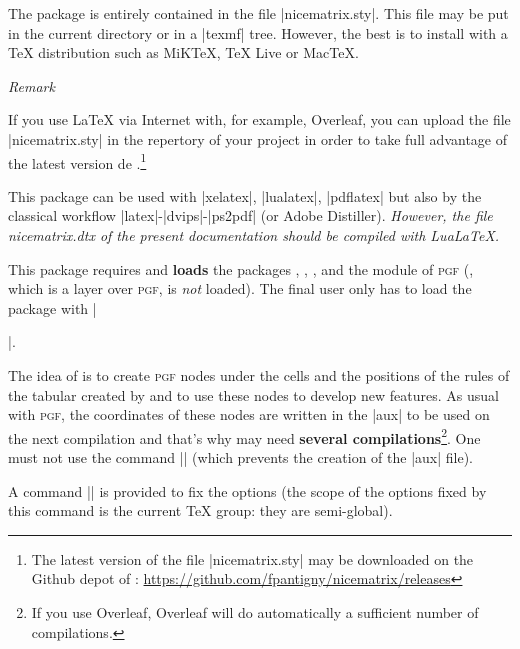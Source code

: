 \documentclass[dvipsnames]{article}%
\begin{document}
\vspace{1cm}
The package  is entirely contained in the file
|nicematrix.sty|. This file may be put in the current directory or in a
|texmf| tree. However, the best is to install  with a TeX
distribution such as MiKTeX, TeX Live or MacTeX.

\medskip
\emph{Remark}\par\nobreak

If you use LaTeX via Internet with, for example, Overleaf, you
can upload the file |nicematrix.sty| in the repertory of your 
project in order to take full advantage of the latest version de
.\footnote{The latest version of the file
|nicematrix.sty| may be downloaded on the Github depot of :\newline
\small
\url{https://github.com/fpantigny/nicematrix/releases}}

\medskip
This package can be used with |xelatex|, |lualatex|, |pdflatex| but also by
the classical workflow |latex|-|dvips|-|ps2pdf| (or Adobe Distiller).
\textsl{However, the file nicematrix.dtx of the present documentation should
be compiled with LuaLaTeX.}

\medskip
This package requires and \textbf{loads} the packages ,
, ,  and the module  of
\textsc{pgf} (, which is a layer over \textsc{pgf}, is \emph{not}
loaded). The final user only has to load the package with
|\usepackage{nicematrix}|.


\medskip
The idea of  is to create \textsc{pgf} nodes under the cells
and the positions of the rules of the tabular created by  and to
use these nodes to develop new features. As usual with \textsc{pgf}, the
coordinates of these nodes are written in the |aux| to be used on the next
compilation and that's why  may need \textbf{several
compilations}\footnote{If you use Overleaf, Overleaf will do automatically
a sufficient number of compilations.}. One must not use the command |\nofiles|
(which prevents the creation of the |aux| file).


\medskip
{}
A command |\NiceMatrixOptions| is provided to fix the options (the
scope of the options fixed by this command is the current TeX group: they are
semi-global). 
\end{document}
